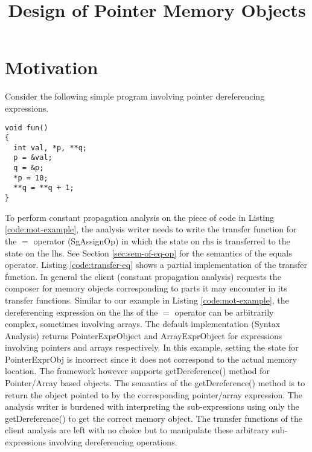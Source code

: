 \documentclass{article}
\begin{document}
\title{Design of Pointer Memory Objects}
\date{}
\maketitle
\section{Motivation}
Consider the following simple program involving pointer dereferencing expressions.
\lstset{
caption=Motivating Example,
label=code:mot-example
}
\begin{lstlisting}
void fun()
{
  int val, *p, **q;
  p = &val;
  q = &p;
  *p = 10;
  **q = **q + 1;
}
\end{lstlisting}

\noindent To perform constant propagation analysis on the piece of code in Listing \ref{code:mot-example}, the analysis writer needs to write the transfer function for the $=$ operator (SgAssignOp) in which the state on rhs is transferred to the state on the lhs. See Section \ref{sec:sem-of-eq-op} for the semantics of the equals operator. Listing \ref{code:transfer-eq} shows a partial implementation of the transfer function. In general the client (constant propagation analysis) requests the composer for memory objects corresponding to parts it may encounter in its transfer functions. Similar to our example in Listing \ref{code:mot-example}, the dereferencing expression on the lhs of the $=$ operator can be arbitrarily complex, sometimes involving arrays. The default implementation (Syntax Analysis) returns PointerExprObject and ArrayExprObject for expressions involving pointers and arrays respectively. In this example, setting the state for PointerExprObj is incorrect since it does not correspond to the actual memory location. The framework however supports getDereference() method for Pointer/Array based objects. The semantics of the getDereference() method is to return the object pointed to by the corresponding pointer/array expression. The analysis writer is burdened with interpreting the sub-expressions using only the getDereference() to get the correct memory object. The transfer functions of the client analysis are left with no choice but to manipulate these arbitrary sub-expressions involving dereferencing operations.
\end{document}
